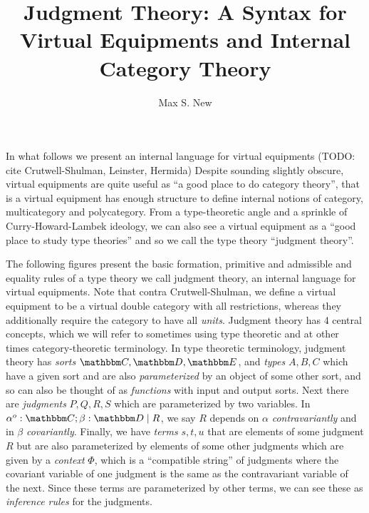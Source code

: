 \documentclass{article}
\begin{document}
\newtheorem{theorem}{Theorem}
\newtheorem{lemma}{Lemma}
\newtheorem{definition}{Definition}
\newcommand{\pto}{\nrightarrow}
\newcommand{\pfrom}{\nleftarrow}
\newcommand{\vcat}{\mathcal}
\newcommand{\cat}{\mathbbm}
\newcommand{\vtkmnd}{\mathbb{K}\text{Mod} (\vcat{V},T)}
\newcommand{\rmod}{\text{RMod}}
\newcommand{\lmod}{\text{LMod}}

\newcommand{\id}{\text{id}}
\newcommand{\for}{\text{for}\,}
\newcommand{\when}{\text{when}\,}
\newcommand{\sort}{\,\text{sort}}
\newcommand{\ctx}{\,\text{context}}
\newcommand{\pipe}{\mathrel{|}}

\title{Judgment Theory: A Syntax for Virtual Equipments and Internal Category Theory}
\author{Max S. New}

\maketitle

In what follows we present an internal language for virtual equipments
(TODO: cite Crutwell-Shulman, Leinster, Hermida)
%
Despite sounding slightly obscure, virtual equipments are quite useful
as ``a good place to do category theory'', that is a virtual equipment
has enough structure to define internal notions of category,
multicategory and polycategory.
%
From a type-theoretic angle and a sprinkle of Curry-Howard-Lambek
ideology, we can also see a virtual equipment as a ``good place to
study type theories'' and so we call the type theory ``judgment
theory''.

The following figures present the basic formation, primitive and
admissible and equality rules of a type theory we call judgment
theory, an internal language for virtual equipments.
%
Note that contra Crutwell-Shulman, we define a virtual equipment to be
a virtual double category with all restrictions, whereas they
additionally require the category to have all \emph{units}.
%
Judgment theory has 4 central concepts, which we will refer to
sometimes using type theoretic and at other times category-theoretic
terminology.
%
In type theoretic terminology, judgment theory has \emph{sorts} $\cat
C, \cat D, \cat E$, and \emph{types} $A,B,C$ which have a given sort
and are also \emph{parameterized} by an object of some other sort, and
so can also be thought of as \emph{functions} with input and output
sorts.
%
Next there are \emph{judgments} $P,Q,R,S$ which are parameterized by
two variables.
%
In $\alpha^o:\cat C;\beta : \cat D \pipe R$, we say $R$ depends on
$\alpha$ \emph{contravariantly} and in $\beta$ \emph{covariantly}.
%
Finally, we have \emph{terms} $s,t,u$ that are elements of some
judgment $R$ but are also parameterized by elements of some other
judgments which are given by a \emph{context} $\Phi$, which is a
``compatible string'' of judgments where the covariant variable of one
judgment is the same as the contravariant variable of the next.
%
Since these terms are parameterized by other terms, we can see these
as \emph{inference rules} for the judgments.
\end{document}
